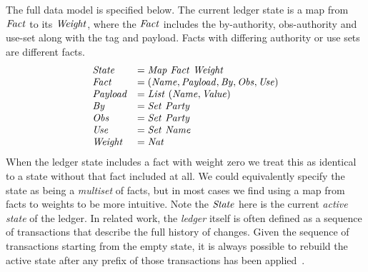 The full data model is specified below. The current ledger state is a map from $\mathit{Fact}$ to its $\mathit{Weight}$, where the $\mathit{Fact}$ includes the by-authority, obs-authority and use-set along with the tag and payload. Facts with differing authority or use sets are different facts.
$$
\begin{array}{ll}
   \mathit{State}   & = \mathit{Map}~ \mathit{Fact}~ \mathit{Weight}
\\ \mathit{Fact}    & = (\mathit{Name}, \mathit{Payload}, \mathit{By}, \mathit{Obs}, \mathit{Use})
\\ \mathit{Payload} & = \mathit{List}~ (\mathit{Name}, \mathit{Value})
\\ \mathit{By}      & = \mathit{Set}~ \mathit{Party}
\\ \mathit{Obs}     & = \mathit{Set}~ \mathit{Party}
\\ \mathit{Use}     & = \mathit{Set}~ \mathit{Name}
\\ \mathit{Weight}  & = \mathit{Nat}
\end{array}
$$
When the ledger state includes a fact with weight zero we treat this as identical to a state without that fact included at all. We could equivalently specify the state as being a \emph{multiset} of facts, but in most cases we find using a map from facts to weights to be more intuitive. Note the $\mathit{State}$ here is the current \emph{active state} of the ledger. In related work, the \emph{ledger} itself is often defined as a sequence of transactions that describe the full history of changes. Given the sequence of transactions starting from the empty state, it is always possible to rebuild the active state after any prefix of those transactions has been applied~\cite{Zahnentferner2018:Chimeric}.



